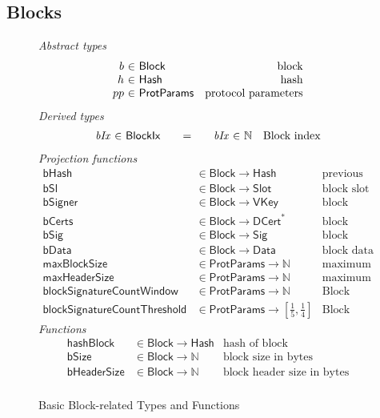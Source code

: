 \documentclass[11pt,a4paper]{article}
\newcommand{\var}[1]{\mathit{#1}}
\newcommand{\fun}[1]{\mathsf{#1}}
\newcommand{\type}[1]{\mathsf{#1}}
\newcommand{\seqof}[1]{#1^{*}}
\newcommand{\Hash}{\type{Hash}}  %
\newcommand{\Slot}{\type{Slot}}
\newcommand{\BlockIx}{\type{BlockIx}}
\newcommand{\Block}{\type{Block}}
\newcommand{\DCert}{\type{DCert}}
\newcommand{\VKey}{\type{VKey}}
\newcommand{\Sig}{\type{Sig}}
\newcommand{\Data}{\type{Data}}
\newcommand{\ProtParams}{\type{ProtParams}} %
\newcommand{\hashname}{bHash}
\newcommand{\bsizename}{bSize}
\newcommand{\bhdrsizename}{bHeaderSize}
\newcommand{\hashofblockname}{hashBlock}
\newcommand{\maxblocksizename}{maxBlockSize}
\newcommand{\maxheadersizename}{maxHeaderSize}
\newcommand{\bdataname}{bData}
\newcommand{\bcertsname}{bCerts}
\newcommand{\bsigname}{bSig}
\newcommand{\bslname}{bSl}
\newcommand{\bsignername}{bSigner}
\newcommand{\totalf}{\to}
\begin{document}
\subsection{Blocks}
\label{sec:blocks}

\begin{figure}
  \emph{Abstract types}
  \begin{equation*}
    \begin{array}{r@{~\in~}lr}
    b & \Block & \text{block} \\
    h & \Hash   & \text{hash} \\
    pp & \ProtParams & \text{protocol parameters}
    \end{array}
  \end{equation*}
  \emph{Derived types}
  \begin{equation*}
  \begin{array}{r@{~\in~}l@{\qquad=\qquad}r@{~\in~}lr}
    \var{bIx} & \BlockIx & \var{bIx} & \mathbb{N} & \text{Block index}
  \end{array}
  \end{equation*}
  \emph{Projection functions}
  \begin{align*}
    \fun{\hashname} & \in \Block \totalf \Hash
      & \text{previous block's hash} \\
    \fun{\bslname} & \in \Block \totalf \Slot & \text{block slot} \\
    \fun{\bsignername} & \in \Block \totalf \VKey & \text{block signer} \\
    \fun{\bcertsname} & \in \Block \totalf \seqof{\DCert}
      & \text{block certificates} \\
    \fun{\bsigname} & \in \Block \totalf \Sig & \text{block signature} \\
    \fun{\bdataname} & \in \Block \totalf \Data & \text{block data} \\
    \fun{\maxblocksizename} & \in \ProtParams \totalf \mathbb{N} & \text{maximum block size} \\
    \fun{\maxheadersizename} & \in \ProtParams \totalf \mathbb{N}
      & \text{maximum block header size} \\
    \fun{blockSignatureCountWindow} & \in \ProtParams \totalf \mathbb{N} & \text{Block signature count window size} \\
    \fun{blockSignatureCountThreshold} & \in \ProtParams \totalf \left[\frac{1}{5}, \frac{1}{4}\right] & \text{Block signature count threshold}
  \end{align*}
  \emph{Functions}
  \begin{align*}
    \fun{\hashofblockname} & \in \Block \totalf \Hash & \text{hash of block} \\
    \fun{\bsizename} & \in \Block \totalf \mathbb{N} & \text{block size in bytes} \\
    \fun{\bhdrsizename} & \in \Block \totalf \mathbb{N}
      & \text{block header size in bytes}\\
  \end{align*}
  \caption{Basic Block-related Types and Functions}
  \label{fig:block-defs}
\end{figure}
\end{document}
